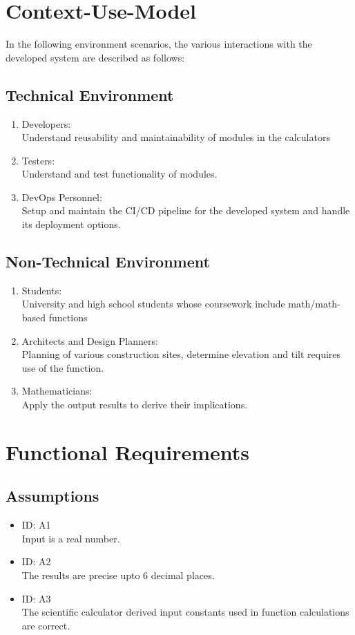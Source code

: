 \documentclass[a4paper,12pt]{article}
\begin{document}
\pagebreak

\section{Context-Use-Model}
In the following environment scenarios, the various interactions with the developed system are described as follows:
    \subsection{Technical Environment}
    \begin{enumerate}
    \item{Developers: \\[1\baselineskip] Understand reusability and maintainability of modules in the calculators }
    \item{Testers: \\[1\baselineskip] Understand and test functionality of modules.}
    \item{DevOps Personnel: \\[1\baselineskip] Setup and maintain the CI/CD pipeline for the developed system and handle its deployment options. }
    \end{enumerate}
    \subsection{Non-Technical Environment}
    \begin{enumerate}
        \item {Students: \\[1\baselineskip] University and high school students whose coursework include math/math-based functions}
        \item{Architects and Design Planners: \\[1\baselineskip] Planning of various construction sites, determine elevation and tilt requires use of the function.}
        \item{Mathematicians: \\[1\baselineskip]  Apply the output results to derive their implications. }
    \end{enumerate}

\section{Functional Requirements}
    \subsection{Assumptions}
    \begin{itemize}
        \item {ID: A1 \\[1\baselineskip] Input is a real number.}
        \item {ID: A2 \\[1\baselineskip] The results are precise upto 6 decimal places.}
        \item{ID: A3 \\[1\baselineskip] The scientific calculator derived input constants used in function calculations are correct.}
    \end{itemize}
\end{document}
